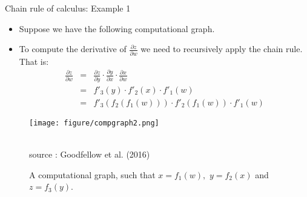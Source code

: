 \begin{vbframe}{Chain rule of calculus: Example 1}
  \begin{minipage}{0.5\textwidth}
    \begin{itemize}
      \item Suppose we have the following computational graph.
      \item To compute the derivative of $\frac{\partial z}{\partial w}$ %
      we need to recursively apply the chain rule. That is:
      \begin{eqnarray*}
        \frac{\partial z}{\partial w} &=& \frac{\partial z}{\partial y} \cdot \frac{\partial y}{\partial x} \cdot \frac{\partial x}{\partial w} \\
                                  &=& f'_3(y) \cdot f'_2(x) \cdot f'_1(w) \\
                                  &=& f'_3(f_2(f_1(w))) \cdot f'_2(f_1(w)) \cdot f'_1(w)
      \end{eqnarray*}
    \end{itemize}
  \end{minipage}\hfill
  \begin{minipage}{0.32\textwidth}
    \begin{figure}
      \centering
        \texttt{[image: figure/compgraph2.png]}
        \begin{footnotesize}
        \tiny{\\source : Goodfellow et al. (2016)}
        \caption{A computational graph, such that $x = f_1(w),$ $y = f_2(x)$ and $z = f_3(y)$.}
        \end{footnotesize}
    \end{figure}
  \end{minipage}
\end{vbframe}


